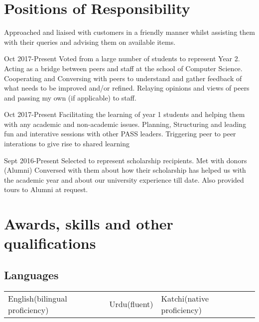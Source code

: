 \documentclass{my_cv}
\begin{document}
\section{Positions of Responsibility}



\workitemOne
{Approached and liaised with customers in a friendly manner whilst assisting them with their queries and advising them on available items.
}

{Oct 2017-Present }
\workitemFour
{Voted from a large number of students to represent Year 2.}
{Acting as a bridge between peers and staff at the school of Computer Science.}
{Cooperating and Conversing with peers to understand and gather feedback of what needs to be improved and/or refined.}
{Relaying opinions and views of peers and passing my own (if applicable) to staff.}


{Oct 2017-Present }
\workitemThree
{Facilitating the learning of year 1 students and helping them with any academic and non-academic issues. }
{Planning, Structuring and leading fun and interative sessions with other PASS leaders.}
{Triggering peer to peer interations to give rise to shared learning}

{Sept 2016-Present }
\workitemThree
{Selected to represent scholarship recipients.}
{Met with donors (Alumni)}
{Conversed with them about how their scholarship has helped us with the academic year and about our university experience till date. Also provided tours to Alumni at request. 
}


\section{Awards, skills and other qualifications}


\subsection{Languages}
\begin{tabular}{l l l l}
English(bilingual proficiency) & Urdu(fluent) &  Katchi(native proficiency) 
\end{tabular}
\end{document}
